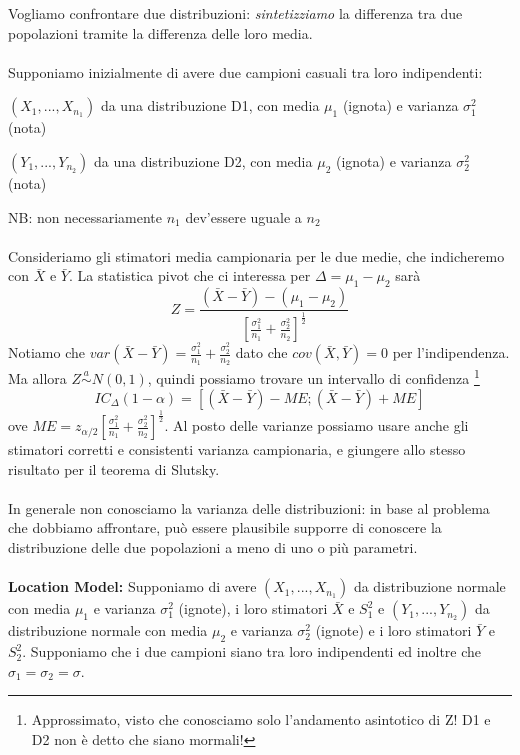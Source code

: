 Vogliamo confrontare due distribuzioni: \textit{sintetizziamo} la differenza tra due popolazioni tramite la differenza delle loro media. \\ \\
Supponiamo inizialmente di avere due campioni casuali tra loro indipendenti: 

\noindent $(X_1,...,X_{n_1})$ da una distribuzione D1, con media $\mu_1$ (ignota) e varianza $\sigma_1^2$ (nota)

\noindent $(Y_1,...,Y_{n_2})$ da una distribuzione D2, con media $\mu_2$ (ignota) e varianza $\sigma_2^2$ (nota)

\noindent NB: non necessariamente $n_1$ dev'essere uguale a $n_2$
\\ \\
Consideriamo gli stimatori media campionaria per le due medie, che indicheremo con $\bar{X}$ e $\bar{Y}$.
La statistica pivot che ci interessa per $\Delta=\mu_1-\mu_2$ sarà $$Z=\frac{(\bar{X} - \bar{Y})-(\mu_1 - \mu_2)}{\left[ \frac{\sigma_1^2}{n_1} + \frac{\sigma_2^2}{n_2} \right]^{\frac{1}{2}}}$$
Notiamo che $var(\bar{X} - \bar{Y})=\frac{\sigma_1^2}{n_1} + \frac{\sigma_2^2}{n_2}$ dato che $cov(\bar{X} , \bar{Y})=0$ per l'indipendenza.
Ma allora $Z \stackrel{a}{\sim} N(0,1)$, quindi possiamo trovare un intervallo di confidenza \footnote{Approssimato, visto che conosciamo solo l'andamento asintotico di Z! D1 e D2 non è detto che siano mormali!}
$$IC_\Delta(1-\alpha)=[(\bar{X} - \bar{Y})-ME;(\bar{X} - \bar{Y})+ME]$$ ove $ME=z_{\alpha/2} \left[ \frac{\sigma_1^2}{n_1} + \frac{\sigma_2^2}{n_2} \right]^{\frac{1}{2}}$.
Al posto delle varianze possiamo usare anche gli stimatori corretti e consistenti varianza campionaria, e giungere allo stesso risultato per il teorema di Slutsky.
\\ \\
In generale non conosciamo la varianza delle distribuzioni: in base al problema che dobbiamo affrontare, può essere plausibile supporre di conoscere la distribuzione delle due popolazioni a meno di uno o più parametri. \\ \\ 
\textbf{Location Model:} Supponiamo di avere $(X_1,...,X_{n_1})$ da distribuzione normale con media $\mu_1$ e varianza $\sigma_1^2$ (ignote), i loro stimatori $\bar{X}$ e $S^2_1$ e
 $(Y_1,...,Y_{n_2})$ da distribuzione normale con media $\mu_2$ e varianza $\sigma_2^2$ (ignote) e i loro stimatori $\bar{Y}$ e $S^2_2$. Supponiamo che i due campioni siano tra loro indipendenti ed inoltre che $\sigma_1=\sigma_2=\sigma$.
